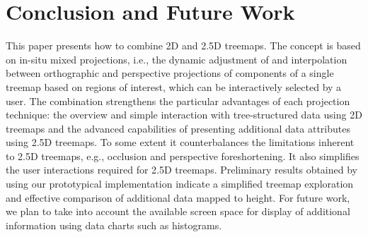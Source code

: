 
\section{Conclusion and Future Work}
\label{sec:conclusions}

\noindent
This paper presents how to combine 2D and 2.5D treemaps.
The concept is based on in-situ mixed projections, i.e., the dynamic adjustment of and interpolation between orthographic and perspective projections of components of a single treemap based on regions of interest, which can be interactively selected by a user.
The combination strengthens the particular advantages of each projection technique: the overview and simple interaction with tree-structured data using 2D treemaps and the advanced capabilities of presenting additional data attributes using 2.5D treemaps.
To some extent it counterbalances the limitations inherent to 2.5D treemaps, e.g., occlusion and perspective foreshortening.
It also simplifies the user interactions required for 2.5D treemaps.
Preliminary results obtained by using our prototypical implementation indicate a simplified treemap exploration and effective comparison of additional data mapped to height.
For future work, we plan to take into account the available screen space for display of additional information using data charts such as histograms.
